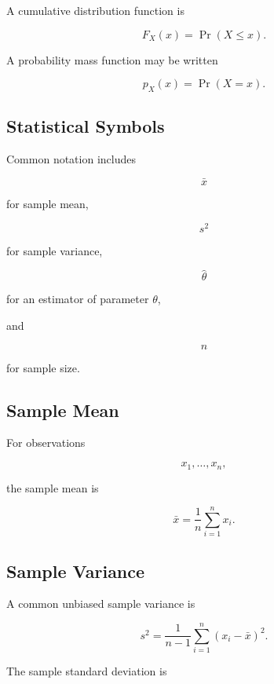 A cumulative distribution function is

\[
\boxed{
F_X(x)
=
\Pr(X\leq x).
}
\]

A probability mass function may be written

\[
\boxed{
p_X(x)
=
\Pr(X=x).
}
\]

\subsection{Statistical Symbols}
\label{subsec:statistical-symbols-reference}

Common notation includes

\[
\boxed{
\bar{x}
}
\]

for sample mean,

\[
\boxed{
s^2
}
\]

for sample variance,

\[
\boxed{
\hat{\theta}
}
\]

for an estimator of parameter \(\theta\),

and

\[
\boxed{
n
}
\]

for sample size.

\subsection{Sample Mean}
\label{subsec:sample-mean-reference}

For observations

\[
x_1,\ldots,x_n,
\]

the sample mean is

\[
\boxed{
\bar{x}
=
\frac1n
\sum_{i=1}^{n}x_i.
}
\]

\subsection{Sample Variance}
\label{subsec:sample-variance-reference}

A common unbiased sample variance is

\[
\boxed{
s^2
=
\frac{1}{n-1}
\sum_{i=1}^{n}
(x_i-\bar{x})^2.
}
\]

The sample standard deviation is

